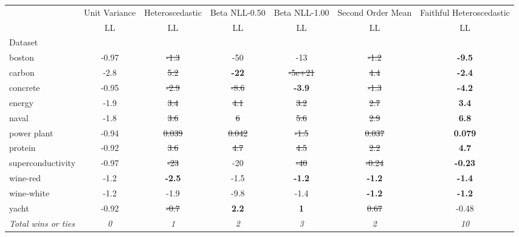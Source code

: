 \begin{tabular}{l|c|c|c|c|c|c}
\toprule
{} & {Unit Variance} & {Heteroscedastic} & {Beta NLL-0.50} & {Beta NLL-1.00} & {Second Order Mean} & {Faithful Heteroscedastic} \\
{} & {LL} & {LL} & {LL} & {LL} & {LL} & {LL} \\
{Dataset} & {} & {} & {} & {} & {} & {} \\
\midrule
boston & -0.97 & \sout{-1.3} & -50 & -13 & \sout{-1.2} & \textbf{-9.5} \\
carbon & -2.8 & \sout{5.2} & \textbf{-22} & \sout{-5e+21} & \sout{4.4} & \textbf{-2.4} \\
concrete & -0.95 & \sout{-2.9} & \sout{-8.6} & \textbf{-3.9} & \sout{-1.3} & \textbf{-4.2} \\
energy & -1.9 & \sout{3.4} & \sout{4.1} & \sout{3.2} & \sout{2.7} & \textbf{3.4} \\
naval & -1.8 & \sout{3.6} & \sout{6} & \sout{5.6} & \sout{2.9} & \textbf{6.8} \\
power plant & -0.94 & \sout{0.039} & \sout{0.042} & \sout{-1.5} & \sout{0.037} & \textbf{0.079} \\
protein & -0.92 & \sout{3.6} & \sout{4.7} & \sout{4.5} & \sout{2.2} & \textbf{4.7} \\
superconductivity & -0.97 & \sout{-23} & -20 & \sout{-40} & \sout{-0.24} & \textbf{-0.23} \\
wine-red & -1.2 & \textbf{-2.5} & -1.5 & \textbf{-1.2} & \textbf{-1.2} & \textbf{-1.4} \\
wine-white & -1.2 & -1.9 & -9.8 & -1.4 & \textbf{-1.2} & \textbf{-1.2} \\
yacht & -0.92 & \sout{-0.7} & \textbf{2.2} & \textbf{1} & \sout{0.67} & -0.48 \\
\textit{{Total wins or ties}} & \textit{0} & \textit{1} & \textit{2} & \textit{3} & \textit{2} & \textit{10} \\
\bottomrule
\end{tabular}
